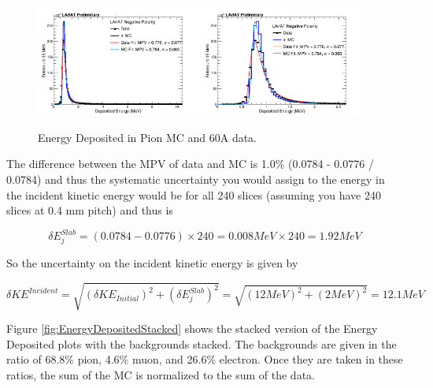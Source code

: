 \begin{figure}[htb]
\centering
\includegraphics[width=0.48\textwidth]{Studies/Figures/DepEnergy_Fit_v1.png}
\includegraphics[width=0.48\textwidth]{Studies/Figures/DepEnergy_Fit_v4.png}
\caption[]{ Energy Deposited in Pion MC and 60A data.  } \label{fig:EnergyDeposited}
\end{figure}

The difference between the MPV of data and MC is 1.0\% (0.0784 - 0.0776 / 0.0784) and thus the systematic uncertainty you would assign to the energy in the incident kinetic energy would be for all 240 slices (assuming you have 240 slices at 0.4 mm pitch) and thus is 

\begin{equation}
\delta E^{Slab}_{j} = (0.0784 - 0.0776) \times 240 = 0.008 MeV \times 240 = 1.92 MeV 
\end{equation}

So the uncertainty on the incident kinetic energy is given by

\begin{equation}
\delta KE^{Incident} = \sqrt{ (\delta KE_{Initial})^2 + (\delta E^{Slab}_{j})^2} = \sqrt{(12 MeV)^2 + (2 MeV)^2} = 12.1 MeV
\end{equation}

Figure \ref{fig:EnergyDepositedStacked} shows the stacked version of the Energy Deposited plots with the backgrounds stacked. The backgrounds are given in the ratio of 68.8\% pion, 4.6\% muon, and 26.6\% electron. Once they are taken in these ratios, the sum of the MC is normalized to the sum of the data.

